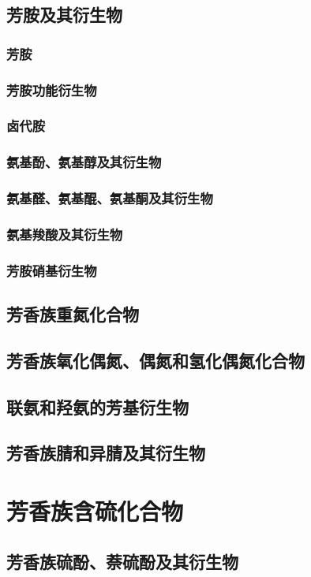 \documentclass[UTF8]{../03-Chemistry}
\begin{document}
    \subsection{芳胺及其衍生物}
        \subsubsection{芳胺}
        \subsubsection{芳胺功能衍生物}
        \subsubsection{卤代胺}
        \subsubsection{氨基酚、氨基醇及其衍生物}
        \subsubsection{氨基醛、氨基醌、氨基酮及其衍生物}
        \subsubsection{氨基羧酸及其衍生物}
        \subsubsection{芳胺硝基衍生物}
    \subsection{芳香族重氮化合物}
    \subsection{芳香族氧化偶氮、偶氮和氢化偶氮化合物}
    \subsection{联氨和羟氨的芳基衍生物}
    \subsection{芳香族腈和异腈及其衍生物}
\section{芳香族含硫化合物}
    \subsection{芳香族硫酚、萘硫酚及其衍生物}
\end{document}
